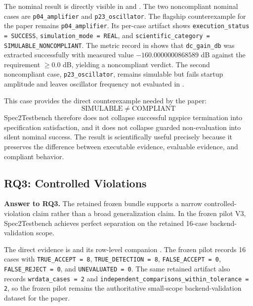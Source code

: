 The nominal result is directly visible in  and . The two noncompliant nominal cases are \texttt{p04\_amplifier} and \texttt{p23\_oscillator}. The flagship counterexample for the paper remains \texttt{p04\_amplifier}. Its per-case artifact  shows \texttt{execution\_status = SUCCESS}, \texttt{simulation\_mode = REAL}, and \texttt{scientific\_category = SIMULABLE\_NONCOMPLIANT}. The metric record in  shows that \texttt{dc\_gain\_db} was extracted successfully with measured value \(-160.0000000868589\) dB against the requirement \(\ge 0.0\) dB, yielding a noncompliant verdict. The second noncompliant case, \texttt{p23\_oscillator}, remains simulable but fails startup amplitude and leaves oscillator frequency not evaluated in .

This case provides the direct counterexample needed by the paper:
\[
\mathrm{SIMULABLE} \neq \mathrm{COMPLIANT}
\]
Spec2Testbench therefore does not collapse successful ngspice termination into specification satisfaction, and it does not collapse guarded non-evaluation into silent nominal success. The result is scientifically useful precisely because it preserves the difference between executable evidence, evaluable evidence, and compliant behavior.

\subsection{RQ3: Controlled Violations}
\textbf{Answer to RQ3.} The retained frozen bundle supports a narrow controlled-violation claim rather than a broad generalization claim. In the frozen pilot V3, Spec2Testbench achieves perfect separation on the retained 16-case backend-validation scope.

The direct evidence is  and its row-level companion . The frozen pilot records 16 cases with \texttt{TRUE\_ACCEPT = 8}, \texttt{TRUE\_DETECTION = 8}, \texttt{FALSE\_ACCEPT = 0}, \texttt{FALSE\_REJECT = 0}, and \texttt{UNEVALUATED = 0}. The same retained artifact also records \texttt{wrdata\_cases = 2} and \texttt{independent\_comparisons\_within\_tolerance = 2}, so the frozen pilot remains the authoritative small-scope backend-validation dataset for the paper.

